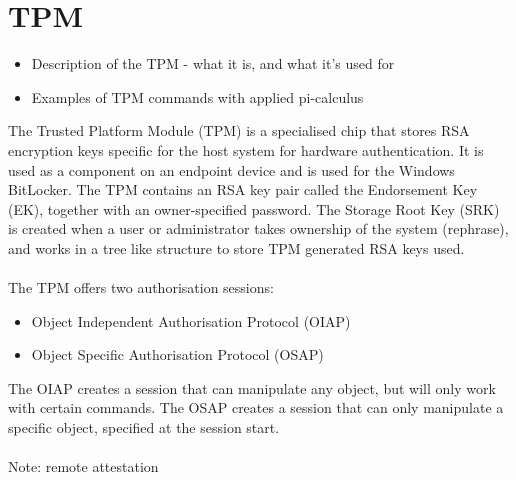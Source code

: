 \section{TPM}
\begin{itemize}
  \item Description of the TPM - what it is, and what it's used for
  \item Examples of TPM commands with applied pi-calculus
\end{itemize}

The Trusted Platform Module (TPM) is a specialised chip that stores RSA encryption keys specific for the host system for hardware authentication. It is used as a component on an endpoint device and is used for the Windows BitLocker.
The TPM contains an RSA key pair called the Endorsement Key (EK), together with an owner-specified password. The Storage Root Key (SRK) is created when a user or administrator takes ownership of the system (rephrase), and works in a tree like structure to store TPM generated RSA keys used. \\ \\
The TPM offers two authorisation sessions:
\begin{itemize}
  \item Object Independent Authorisation Protocol (OIAP)
  \item Object Specific Authorisation Protocol (OSAP)
\end{itemize}
The OIAP creates a session that can manipulate any object, but will only work with certain commands. The OSAP creates a session that can only manipulate a specific object, specified at the session start. \\ \\

Note: remote attestation